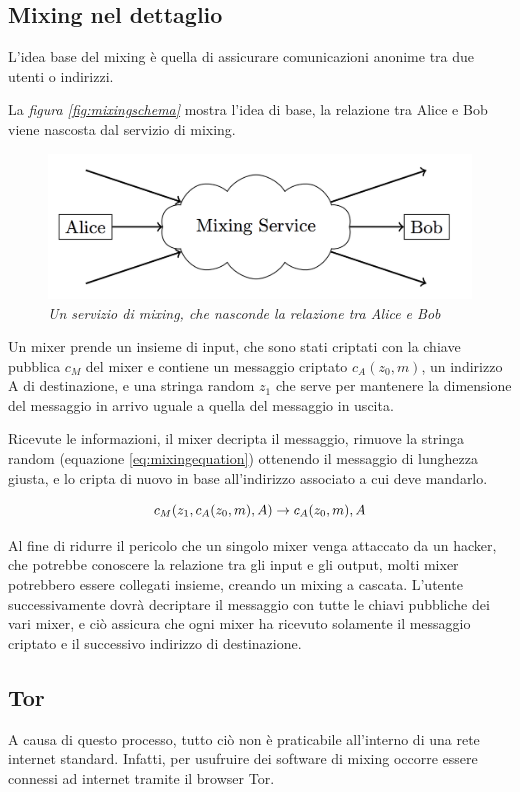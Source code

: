 \subsection{Mixing nel dettaglio}
L'idea base del mixing è quella di assicurare comunicazioni anonime tra due utenti o indirizzi.

 La \textit{figura \ref{fig:mixingschema}} mostra l'idea di base, la relazione tra Alice e Bob viene nascosta dal servizio di mixing.
\begin{figure}[htbp]
	\centering
	\includegraphics[width = 0.7 \linewidth]{figure/moesermixservice}
	\caption{\textit{Un servizio di mixing, che nasconde la relazione tra Alice e Bob}}\label{moesermixservice}
\end{figure}

Un mixer prende un insieme di input, che sono stati criptati con la chiave pubblica $c_M$ del mixer e contiene un messaggio criptato $c_A(z_0,m)$, un indirizzo A di destinazione, e una stringa random $z_1$ che serve per mantenere la dimensione del messaggio in arrivo uguale a quella del messaggio in uscita.

Ricevute le informazioni, il mixer decripta il messaggio, rimuove la stringa random (equazione \eqref{eq:mixingequation}) ottenendo il messaggio di lunghezza giusta, e lo cripta di nuovo in base all'indirizzo associato a cui deve mandarlo.

\begin{equation}
	\centering
	c_M(z_1,c_A(z_0,m),A) \to c_A(z_0,m),A
	\label{eq:mixingequation}
\end{equation}

Al fine di ridurre il pericolo che un singolo mixer venga attaccato da un hacker, che potrebbe conoscere la relazione tra gli input e gli output, molti mixer potrebbero essere collegati insieme, creando un mixing a cascata. L'utente successivamente dovrà decriptare il messaggio con tutte le chiavi pubbliche dei vari mixer, e ciò assicura che ogni mixer ha ricevuto solamente il messaggio criptato e il successivo indirizzo di destinazione.\cite{moser2013anonymity}



\subsection{Tor}
A causa di questo processo, tutto ciò non è praticabile all'interno di una rete internet standard. Infatti, per usufruire dei software di mixing occorre essere connessi ad internet tramite il browser Tor.

